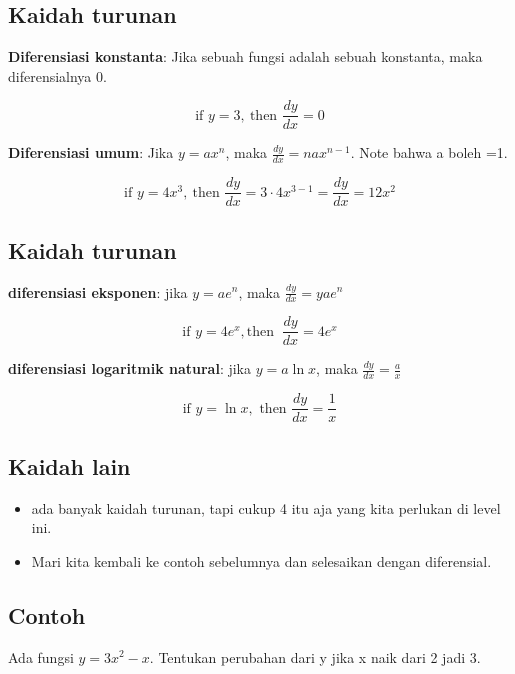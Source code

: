 \documentclass[
  letterpaper,
  DIV=11,
  numbers=noendperiod]{scrartcl}
\begin{document}
\hypertarget{kaidah-turunan}{%
\subsection{Kaidah turunan}\label{kaidah-turunan}}

\textbf{Diferensiasi konstanta}: Jika sebuah fungsi adalah sebuah
konstanta, maka diferensialnya 0.

\[
\text{if }y=3, \ \text{then } \frac{dy}{dx}=0
\]

\textbf{Diferensiasi umum}: Jika \(y=ax^n\), maka
\(\frac{dy}{dx}=nax^{n-1}\). Note bahwa a boleh =1.

\[
\text{if }y=4x^3, \ \text{then } \frac{dy}{dx}=3\cdot 4x^{3-1}=\frac{dy}{dx}=12x^2
\]

\hypertarget{kaidah-turunan-1}{%
\subsection{Kaidah turunan}\label{kaidah-turunan-1}}

\textbf{diferensiasi eksponen}: jika \(y=ae^n\), maka
\(\frac{dy}{dx}=yae^n\)

\[
\text{if } y=4e^x, \text{then } \ \frac{dy}{dx}=4e^x
\]

\textbf{diferensiasi logaritmik natural}: jika \(y=a \ln x\), maka
\(\frac{dy}{dx}=\frac{a}{x}\)

\[
\text{if }y= \ln x, \text{ then } \frac{dy}{dx}=\frac{1}{x}
\]

\hypertarget{kaidah-lain}{%
\subsection{Kaidah lain}\label{kaidah-lain}}

\begin{itemize}
\item
  ada banyak kaidah turunan, tapi cukup 4 itu aja yang kita perlukan di
  level ini.
\item
  Mari kita kembali ke contoh sebelumnya dan selesaikan dengan
  diferensial.
\end{itemize}

\hypertarget{contoh-6}{%
\subsection{Contoh}\label{contoh-6}}

Ada fungsi \(y=3x^2-x\). Tentukan perubahan dari y jika x naik dari 2
jadi 3.
\end{document}

